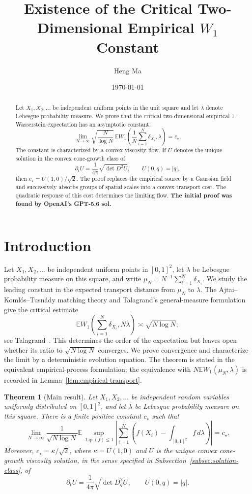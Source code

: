\documentclass{smfart}
\title{Existence of the Critical Two-Dimensional Empirical \(W_1\) Constant}
\author{Heng Ma}
\date{\today}
\newtheorem{theorem}{Theorem}[section]
\theoremstyle{definition}
\newcommand{\1}{\mathbf 1}
\newcommand{\Lip}{\operatorname{Lip}}
\begin{document}
\begin{abstract}
Let \(X_1,X_2,\ldots\) be independent uniform points in the unit square and let
\(\lambda\) denote Lebesgue probability measure.  We prove that the critical
two-dimensional empirical \(1\)-Wasserstein expectation has an asymptotic
constant:
\[
  \lim_{N\to\infty}
  \sqrt{\frac{N}{\log N}}\,
  \mathbb E W_1\!\left(\frac1N\sum_{i=1}^N\delta_{X_i},\lambda\right)
  =c_\star.
\]
The constant is characterized by a convex viscosity flow.  If \(U\) denotes the
unique solution in the convex cone-growth class of
\[
  \partial_tU=\frac1{4\pi}\sqrt{\det D^2U},
  \qquad U(0,q)=|q|,
\]
then \(c_\star=U(1,0)/\sqrt2\).  The proof replaces the empirical source
by a Gaussian field and successively absorbs groups of spatial scales
into a convex transport cost.  The quadratic response of this cost
determines the limiting flow. \textbf{The initial proof  was found by OpenAI's GPT-5.6 sol.}
\end{abstract}

\maketitle

\tableofcontents

\section{Introduction}\label{sec:introduction}

Let $X_1,X_2,\ldots$ be independent uniform points in $[0,1]^2$, let
$\lambda$ be Lebesgue probability measure on this square, and write
$\mu_N=N^{-1}\sum_{i=1}^N\delta_{X_i}$.  We study the leading constant
in the expected transport distance from $\mu_N$ to $\lambda$.
The Ajtai--Koml\'os--Tusn\'ady matching theory and Talagrand's
general-measure formulation give the critical estimate
\[
  \mathbb E W_1\!\left(\sum_{i=1}^N\delta_{X_i},N\lambda\right)
  \asymp \sqrt{N\log N};
\]
see Talagrand~\cite{Talagrand1992}.  This determines the order of the
expectation but leaves open whether its ratio to $\sqrt{N\log N}$
converges.  We prove convergence and characterize the limit by a
deterministic evolution equation.  The theorem is stated in the equivalent
empirical-process formulation; the equivalence with $N\mathbb E
W_1(\mu_N,\lambda)$ is recorded in Lemma~\ref{lem:empirical-transport}.

\begin{theorem}[Main result]\label{thm:intro-main}
Let \(X_1,X_2,\ldots\) be independent random variables uniformly distributed
on \([0,1]^2\), and let \(\lambda\) be Lebesgue probability measure on this
square.  There is a finite positive constant \(c_\star\) such that
\[
\lim_{N\to\infty}\frac1{\sqrt{N\log N}}
\mathbb E\sup_{\Lip(f)\leq1}
\left|\sum_{i=1}^N\left(f(X_i)-\int_{[0,1]^2}f\,d\lambda\right)\right|
=c_\star.
\]
Moreover, \(c_\star=\kappa/\sqrt2\), where \(\kappa=U(1,0)\) and \(U\) is
the unique convex cone-growth viscosity solution, in the sense specified
in Subsection~\ref{subsec:solution-class}, of
\[
\partial_tU=\frac1{4\pi}\sqrt{\det D_q^2U},
\qquad U(0,q)=|q|.
\]
\end{theorem}
\end{document}

